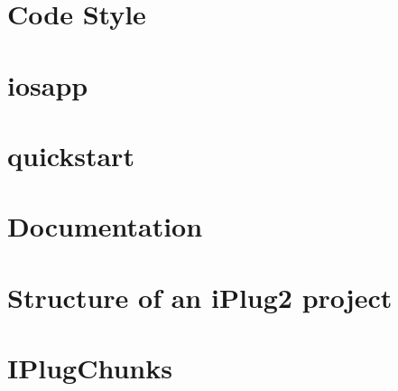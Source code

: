 \let\mypdfximage\pdfximage\def\pdfximage{\immediate\mypdfximage}\documentclass[twoside]{book}
\newcommand{\+}{\discretionary{\mbox{\scriptsize$\hookleftarrow$}}{}{}}
\begin{document}
\chapter{Code Style}
\label{md__c_1__users_fab_src__github_branches__neural_amp_modeler_plugin_i_plug2__documentation_codingstyle}

\chapter{iosapp}
\label{md__c_1__users_fab_src__github_branches__neural_amp_modeler_plugin_i_plug2__documentation_iosapp}

\chapter{quickstart}
\label{md__c_1__users_fab_src__github_branches__neural_amp_modeler_plugin_i_plug2__documentation_quickstart}

\chapter{Documentation}
\label{md__c_1__users_fab_src__github_branches__neural_amp_modeler_plugin_i_plug2__documentation__r_e_a_d_m_e}

\chapter{Structure of an i\+Plug2 project}
\label{md__c_1__users_fab_src__github_branches__neural_amp_modeler_plugin_i_plug2__documentation_structure}

\chapter{I\+Plug\+Chunks}
\label{md__c_1__users_fab_src__github_branches__neural_amp_modeler_plugin_i_plug2__examples__i_plug_chunks__r_e_a_d_m_e}

\end{document}
